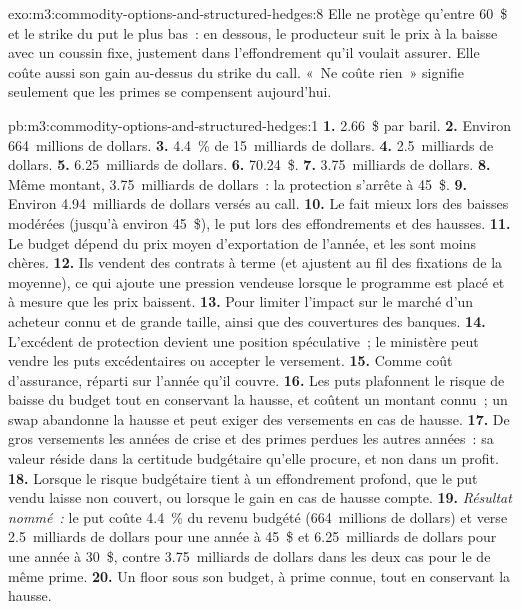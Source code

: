 \begin{solution}{exo:m3:commodity-options-and-structured-hedges:8}
Elle ne protège qu'entre 60~\$ et le strike du put le plus bas~: en dessous, le producteur suit le prix à la baisse avec un
coussin fixe, justement dans l'effondrement qu'il voulait assurer. Elle coûte aussi son gain au-dessus du strike du call.
«~Ne coûte rien~» signifie seulement que les primes se compensent aujourd'hui.
\end{solution}

\begin{solution}{pb:m3:commodity-options-and-structured-hedges:1}
\textbf{1.} 2.66~\$ par baril. \textbf{2.} Environ 664~millions de dollars. \textbf{3.} 4.4~\% de 15~milliards de dollars.
\textbf{4.} 2.5~milliards de dollars. \textbf{5.} 6.25~milliards de dollars. \textbf{6.} 70.24~\$. \textbf{7.} 3.75~milliards de dollars.
\textbf{8.} Même montant, 3.75~milliards de dollars~: la protection s'arrête à 45~\$. \textbf{9.} Environ 4.94~milliards de dollars versés au
call. \textbf{10.} Le  fait mieux lors des baisses modérées (jusqu'à environ 45~\$), le put lors des effondrements et des
hausses. \textbf{11.} Le budget dépend du prix moyen d'exportation de l'année, et les  sont moins chères.
\textbf{12.} Ils vendent des contrats à terme (et ajustent au fil des fixations de la moyenne), ce qui ajoute une pression vendeuse lorsque le
programme est placé et à mesure que les prix baissent. \textbf{13.} Pour limiter l'impact sur le marché d'un acheteur connu et de grande taille, ainsi que des
couvertures des banques. \textbf{14.} L'excédent de protection devient une position spéculative~; le ministère peut vendre
les puts excédentaires ou accepter le versement. \textbf{15.} Comme coût d'assurance, réparti sur l'année qu'il couvre.
\textbf{16.} Les puts plafonnent le risque de baisse du budget tout en conservant la hausse, et coûtent un montant connu~; un swap abandonne
la hausse et peut exiger des versements en cas de hausse. \textbf{17.} De gros versements les années de crise et des primes perdues
les autres années~: sa valeur réside dans la certitude budgétaire qu'elle procure, et non dans un profit. \textbf{18.} Lorsque le risque budgétaire tient à un
effondrement profond, que le put vendu laisse non couvert, ou lorsque le gain en cas de hausse compte. \textbf{19.}
\emph{Résultat nommé~:} le put coûte 4.4~\% du revenu budgété (664~millions de dollars) et verse 2.5~milliards de dollars pour une
année à 45~\$ et 6.25~milliards de dollars pour une année à 30~\$, contre 3.75~milliards de dollars dans les deux cas pour le  de même
prime. \textbf{20.} Un floor sous son budget, à prime connue, tout en conservant la hausse.
\end{solution}

